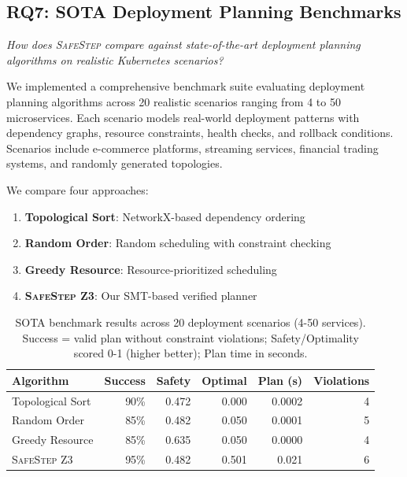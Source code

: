 \documentclass[10pt,twocolumn]{article}
\newcommand{\safestep}{\textsc{SafeStep}}
\begin{document}
\subsection{RQ7: SOTA Deployment Planning Benchmarks}

\emph{How does \safestep{} compare against state-of-the-art
deployment planning algorithms on realistic Kubernetes scenarios?}

We implemented a comprehensive benchmark suite evaluating deployment
planning algorithms across 20 realistic scenarios ranging from 4 to 50
microservices. Each scenario models real-world deployment patterns with
dependency graphs, resource constraints, health checks, and rollback
conditions. Scenarios include e-commerce platforms, streaming services,
financial trading systems, and randomly generated topologies.

We compare four approaches:
\begin{enumerate}[leftmargin=*,nosep]
  \item \textbf{Topological Sort}: NetworkX-based dependency ordering
  \item \textbf{Random Order}: Random scheduling with constraint checking  
  \item \textbf{Greedy Resource}: Resource-prioritized scheduling
  \item \textbf{\safestep{} Z3}: Our SMT-based verified planner
\end{enumerate}

\begin{table}[t]
\centering
\caption{SOTA benchmark results across 20 deployment scenarios (4-50 services).
  Success = valid plan without constraint violations;
  Safety/Optimality scored 0-1 (higher better);
  Plan time in seconds.}
\label{tab:sota-benchmark}
\small
\begin{tabular}{@{}lrrrrr@{}}
\toprule
Algorithm & Success & Safety & Optimal & Plan (s) & Violations \\
\midrule
Topological Sort & 90\% & 0.472 & 0.000 & 0.0002 & 4 \\
Random Order    & 85\% & 0.482 & 0.050 & 0.0001 & 5 \\
Greedy Resource & 85\% & 0.635 & 0.050 & 0.0000 & 4 \\
\safestep{} Z3  & 95\% & 0.482 & 0.501 & 0.021 & 6 \\
\bottomrule
\end{tabular}
\end{table}
\end{document}

